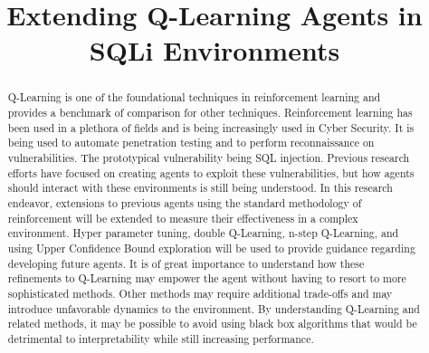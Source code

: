 \documentclass[conference]{IEEEtran}
\begin{document}
 
\title{Extending Q-Learning Agents in SQLi Environments}

\author{
    \and
}


\maketitle

\begin{abstract}
Q-Learning is one of the foundational techniques in reinforcement learning and provides a benchmark of comparison for other techniques. Reinforcement learning has been used in a plethora of fields and is being increasingly used in Cyber Security. It is being used to automate penetration testing and to perform reconnaissance on vulnerabilities.  The prototypical vulnerability being SQL injection. Previous research efforts have focused on creating agents to exploit these vulnerabilities, but how agents should interact with these environments is still being understood. In this research endeavor, extensions to previous agents using the standard methodology of reinforcement will be extended to measure their effectiveness in a complex environment. Hyper parameter tuning, double Q-Learning, n-step Q-Learning, and using Upper Confidence Bound exploration will be used to provide guidance regarding developing future agents. It is of great importance to understand how these refinements to Q-Learning may empower the agent without having to resort to more sophisticated methods. Other methods may require additional trade-offs and may introduce unfavorable dynamics to the environment. By understanding Q-Learning and related methods, it may be possible to avoid using black box algorithms that would be detrimental to interpretability while still increasing performance.  
\end{abstract}
\end{document}
